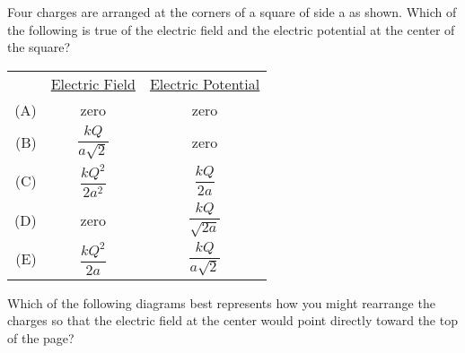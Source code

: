\documentclass{../../oss-classkick-exam}
\begin{document}
\begin{questions}
\begin{multicols*}{2}
    \question Four charges are arranged at the corners of a square of side a as
    shown. Which of the following is true of the electric field and the electric
    potential at the center of the square?
    \begin{center}
    \end{center}
    \begin{tabular}{rcc}
      & \underline{Electric Field} & \underline{Electric Potential}\\
      (A) & zero & zero \\
      (B) & $\dfrac{kQ}{a\sqrt 2}$ & zero \\
      (C) & $\dfrac{kQ^2}{2a^2}$ &  $\dfrac{kQ}{2a}$\\
      (D) & zero &  $\dfrac{kQ}{\sqrt{2a}}$\\
      (E) & $\dfrac{kQ^2}{2a}$ & $\dfrac{kQ}{a\sqrt 2}$
    \end{tabular}
    \vspace{.7in}
    
    \question Which of the following diagrams best represents how you might
    rearrange the charges so that the electric field at the center would point
    directly toward the top of the page?
    

\end{multicols*}
\end{questions}
\end{document}

